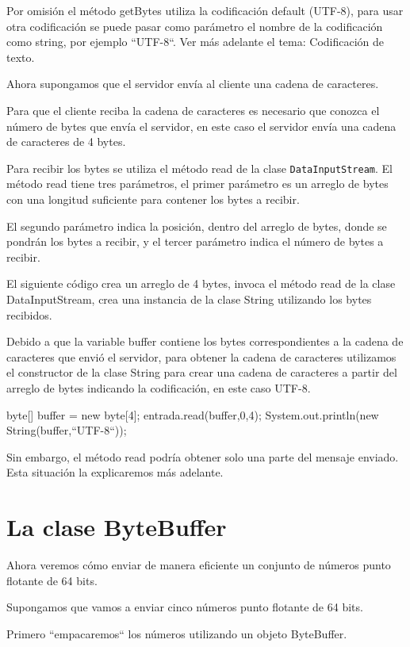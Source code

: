 \documentclass[11pt,a4paper,oneside]{book}
\begin{document}
Por omisión el método getBytes utiliza la codificación default (UTF-8), para usar otra codificación se puede pasar como parámetro el nombre de la codificación como string, por ejemplo ``UTF-8``. Ver más adelante el tema: Codificación de texto.

Ahora supongamos que el servidor envía al cliente una cadena de caracteres.

Para que el cliente reciba la cadena de caracteres es necesario que conozca el número de bytes que envía el servidor, en este caso el servidor envía una cadena de caracteres de 4 bytes.

Para recibir los bytes se utiliza el método read de la clase \texttt{DataInputStream}. El método read tiene tres parámetros, el primer parámetro es un arreglo de bytes con una longitud suficiente para contener los bytes a recibir.

El segundo parámetro indica la posición, dentro del arreglo de bytes, donde se pondrán los bytes a recibir, y el tercer parámetro indica el número de bytes a recibir.

El siguiente código crea un arreglo de 4 bytes, invoca el método read de la clase DataInputStream, crea una instancia de la clase String utilizando los bytes recibidos.

Debido a que la variable buffer contiene los bytes correspondientes a la cadena de caracteres que envió el servidor, para obtener la cadena de caracteres utilizamos el constructor de la clase String para crear una cadena de caracteres a partir del arreglo de bytes indicando la codificación, en este caso UTF-8.

\begin{SourceCode}
byte[] buffer = new byte[4];
entrada.read(buffer,0,4);
System.out.println(new String(buffer,``UTF-8``));
\end{SourceCode}

Sin embargo, el método read podría obtener solo una parte del mensaje enviado. Esta situación la explicaremos más adelante.

\section{La clase ByteBuffer}

Ahora veremos cómo enviar de manera eficiente un conjunto de números punto flotante de 64 bits. 

Supongamos que vamos a enviar cinco números punto flotante de 64 bits.

Primero ``empacaremos`` los números utilizando un objeto ByteBuffer.
\end{document}
